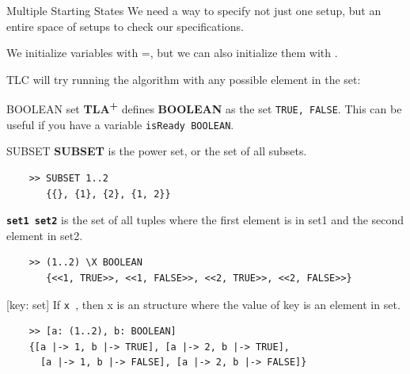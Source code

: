 \documentclass[10pt]{beamer}
\newcommand{\tlaplus}{\textbf{\textsc{TLA\textsuperscript{+}}}\xspace}
\begin{document}
\begin{frame}{Multiple Starting States}
  We need a way to specify not just one setup, but an entire space of setups to check our specifications.

  \framebreak
  
  We initialize variables with =, but we can also initialize them with \textbf{\texttt{\in}}.

  TLC will try running the algorithm with any possible element in the set:

  \multipleStatesSample

  \begin{exampleblock}{BOOLEAN set}
    \tlaplus defines \textbf{BOOLEAN} as the set \texttt{{TRUE, FALSE}}. This can be useful if you have a variable \texttt{isReady \in BOOLEAN}.
  \end{exampleblock}
  
  \framebreak

  \begin{exampleblock}{SUBSET}
    \textbf{SUBSET} is the power set, or the set of all subsets.
  \end{exampleblock}

  \begin{verbatim}
    >> SUBSET 1..2
       {{}, {1}, {2}, {1, 2}}
  \end{verbatim}

  \framebreak
  
  \begin{exampleblock}{\texttt{\X}}
    \textbf{\texttt{set1 \X set2}} is the set of all tuples where the first element is in set1 and the second element in set2.
  \end{exampleblock}

  \begin{verbatim}
    >> (1..2) \X BOOLEAN
       {<<1, TRUE>>, <<1, FALSE>>, <<2, TRUE>>, <<2, FALSE>>}
  \end{verbatim}

  \framebreak

  \begin{exampleblock}{[key: set]}
    If \texttt{x }, then x is an structure where the value of key is an element in set.
  \end{exampleblock}

  \begin{verbatim}
    >> [a: (1..2), b: BOOLEAN]
    {[a |-> 1, b |-> TRUE], [a |-> 2, b |-> TRUE],
      [a |-> 1, b |-> FALSE], [a |-> 2, b |-> FALSE]}
  \end{verbatim}
  
\end{frame}
\end{document}

